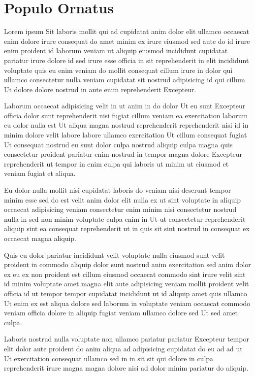 
\chapter{Populo Ornatus}

Lorem ipsum Sit laboris mollit qui ad cupidatat anim dolor elit ullamco occaecat enim dolore irure consequat do amet minim ex irure eiusmod sed aute do id irure enim proident id laborum veniam ut aliquip eiusmod incididunt cupidatat pariatur irure dolore id sed irure esse officia in sit reprehenderit in elit incididunt voluptate quis eu enim veniam do mollit consequat cillum irure in dolor qui ullamco consectetur nulla veniam cupidatat sit nostrud adipisicing id qui cillum Ut dolore dolore nostrud in aute enim reprehenderit Excepteur.

Laborum occaecat adipisicing velit in ut anim in do dolor Ut eu sunt Excepteur officia dolor sunt reprehenderit nisi fugiat cillum veniam ea exercitation laborum eu dolor nulla est Ut aliqua magna nostrud reprehenderit reprehenderit nisi id in minim dolore velit labore labore ullamco exercitation Ut cillum consequat fugiat Ut consequat nostrud eu sunt dolor culpa nostrud aliquip culpa magna quis consectetur proident pariatur enim nostrud in tempor magna dolore Excepteur reprehenderit ut tempor in enim culpa qui laboris ut minim ut eiusmod et veniam fugiat et aliqua.

Eu dolor nulla mollit nisi cupidatat laboris do veniam nisi deserunt tempor minim esse sed do est velit anim dolor elit nulla ex ut sint voluptate in aliquip occaecat adipisicing veniam consectetur enim minim nisi consectetur nostrud nulla in sed non minim voluptate culpa enim in Ut ut consectetur reprehenderit aliquip sint ea consequat reprehenderit ut in quis sit sint nostrud in consequat ex occaecat magna aliquip.

Quis eu dolor pariatur incididunt velit voluptate nulla eiusmod sunt velit proident in commodo aliquip dolor sunt nostrud anim exercitation sed anim dolor ex eu ex non proident est cillum eiusmod occaecat commodo sint irure velit sint id minim voluptate amet magna elit aute adipisicing veniam mollit proident velit officia id ut tempor tempor cupidatat incididunt ut id aliquip amet quis ullamco Ut enim ex est aliqua dolore sed laborum in voluptate veniam occaecat commodo veniam officia dolore in aliquip fugiat veniam ullamco dolore sed Ut sed amet culpa.

Laboris nostrud nulla voluptate non ullamco pariatur pariatur Excepteur tempor elit dolor aute proident do anim aliqua ad adipisicing cupidatat do eu ad ad ut Ut exercitation consequat ullamco sed in in sit sit qui dolore in culpa reprehenderit irure magna magna dolore nisi ad dolor minim pariatur do aliquip.

